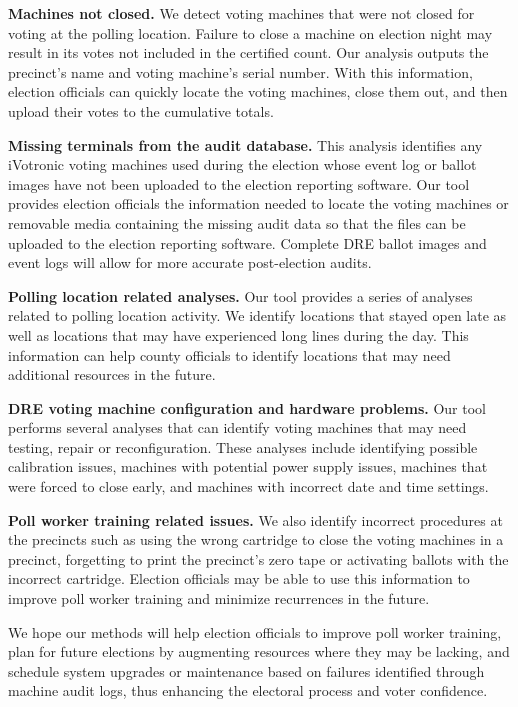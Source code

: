 \textbf{Machines not closed.} We detect voting machines that were not closed for voting at the polling location. Failure to close a machine on election night may result in its votes not included in the certified count. Our analysis outputs the precinct's name and voting machine's serial number. With this information, election officials can quickly locate the voting machines, close them out, and then upload their votes to the cumulative totals.

\textbf{Missing terminals from the audit database.} This analysis identifies any iVotronic voting machines used during the election whose event log or ballot images have not been uploaded to the election reporting software. Our tool provides election officials the information needed to locate the voting machines or removable media containing the missing audit data so that the files can be uploaded to the election reporting software. Complete DRE ballot images and event logs will allow for more accurate post-election audits.

\textbf{Polling location related analyses.} Our tool provides a series of analyses related to polling location activity. We identify locations that stayed open late as well as locations that may have experienced long lines during the day. This information can help county officials to identify locations that may need additional resources in the future. 

\textbf{DRE voting machine configuration and hardware problems.} Our tool performs several analyses that can identify  voting machines that may need testing, repair or reconfiguration. These analyses include identifying possible calibration issues, machines with potential power supply issues, machines that were forced to close early, and machines with incorrect date and time settings.

\textbf{Poll worker training related issues.} We also identify incorrect procedures at the precincts such as using the wrong cartridge to close the voting machines in a precinct, forgetting to print the precinct's zero tape or activating ballots with the incorrect cartridge. Election officials may be able to use this information to improve poll worker training and minimize recurrences in the future.

We hope our methods will help election officials to improve poll worker training, plan for future elections by augmenting resources where they may be lacking, and schedule system upgrades or maintenance based on failures identified through machine audit logs, thus enhancing the electoral process and voter confidence.

